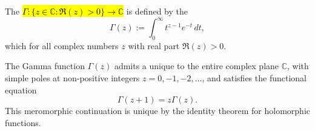 \begin{definition} \label{definition:gamma_function_on_the_complex_numbers}
The  \hl{$\Gamma : \{ z \in \mathbb{C} : \Re(z) > 0 \} \to \mathbb{C}$} is defined by the 
$$
\Gamma(z) := \int_0^\infty t^{z-1} e^{-t} \, dt,
$$
which  for all complex numbers $z$ with real part $\Re(z) > 0$.

The Gamma function $\Gamma(z)$ admits a unique  to the entire complex plane $\mathbb{C}$, with simple poles at non-positive integers $z = 0, -1, -2, \ldots$, and satisfies the functional equation
$$ \Gamma(z+1) = z \Gamma(z). $$
 This meromorphic continuation is unique by the identity theorem for holomorphic functions.
\end{definition}

